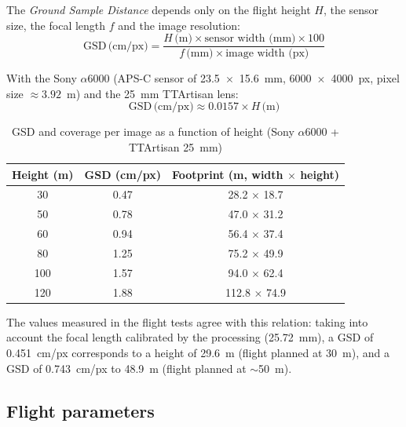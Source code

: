 The \emph{Ground Sample Distance} depends only on the flight height $H$, the sensor size, the focal length $f$ and the image resolution:
\[
\mathrm{GSD}\,\text{(cm/px)} = \frac{H\,\text{(m)} \times \text{sensor width (mm)} \times 100}{f\,\text{(mm)} \times \text{image width (px)}}
\]

With the Sony $\alpha$6000 (APS-C sensor of 23.5~$\times$~15.6~mm, 6000~$\times$~4000~px, pixel size $\approx 3.92$~\textmu m) and the 25~mm TTArtisan lens:
\[
\mathrm{GSD}\,\text{(cm/px)} \approx 0.0157 \times H\,\text{(m)}
\]

\begin{table}[H]
    \centering
    \caption{GSD and coverage per image as a function of height (Sony $\alpha$6000 + TTArtisan 25~mm)}
    \label{tab:gsd-altura}
    \begin{tabular}{ccc}
        \toprule
        Height (m) & GSD (cm/px) & Footprint (m, width $\times$ height) \\
        \midrule
        30 & 0.47 & 28.2 $\times$ 18.7 \\
        50 & 0.78 & 47.0 $\times$ 31.2 \\
        60 & 0.94 & 56.4 $\times$ 37.4 \\
        80 & 1.25 & 75.2 $\times$ 49.9 \\
        100 & 1.57 & 94.0 $\times$ 62.4 \\
        120 & 1.88 & 112.8 $\times$ 74.9 \\
        \bottomrule
    \end{tabular}
\end{table}

The values measured in the flight tests agree with this relation: taking into account the focal length calibrated by the processing (25.72~mm), a GSD of 0.451~cm/px corresponds to a height of 29.6~m (flight planned at 30~m), and a GSD of 0.743~cm/px to 48.9~m (flight planned at $\sim$50~m).

\subsection{Flight parameters}

